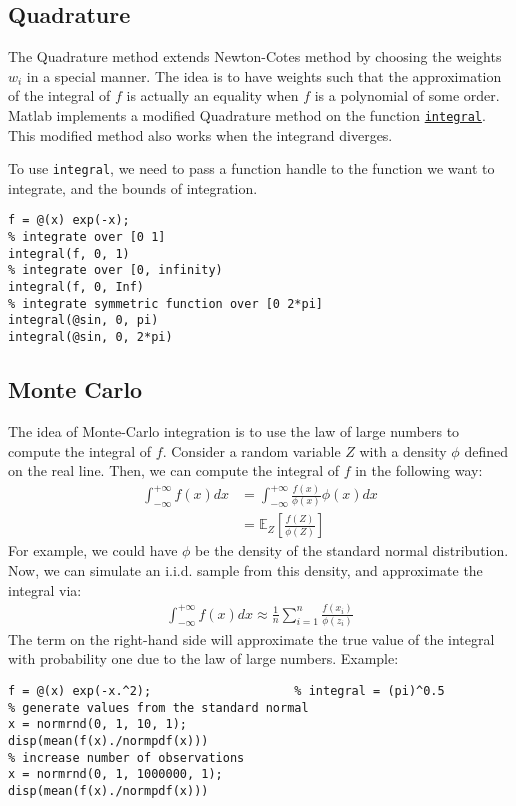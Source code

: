 \documentclass[12pt, a4paper]{article}
\begin{document}
\subsection{Quadrature}
\label{sec:org4ff9752}
The Quadrature method extends Newton-Cotes method by choosing the weights \(w_i\) in a special manner.
The idea is to have weights such that the approximation of the integral of \(f\) is actually an equality when \(f\) is a polynomial of some order.
Matlab implements a modified Quadrature method on the function \href{https://www.mathworks.com/help/matlab/ref/integral.html}{\texttt{integral}}.
This modified method also works when the integrand diverges.

To use \texttt{integral}, we need to pass a function handle to the function we want to integrate, and the bounds of integration.
\lstset{language=matlab,label= ,caption= ,captionpos=b,firstnumber=1,numbers=left,style=Matlab-editor}
\begin{lstlisting}
f = @(x) exp(-x);
% integrate over [0 1]
integral(f, 0, 1)
% integrate over [0, infinity)
integral(f, 0, Inf)
% integrate symmetric function over [0 2*pi]
integral(@sin, 0, pi)
integral(@sin, 0, 2*pi)
\end{lstlisting}
\subsection{Monte Carlo}
\label{sec:org228ac69}
The idea of Monte-Carlo integration is to use the law of large numbers to compute the integral of \(f\).
Consider a random variable \(Z\) with a density \(\phi\) defined on the real line.
Then, we can compute the integral of \(f\) in the following way:
\begin{align*}
\int_{-\infty}^{+\infty}f(x)dx &= \int_{-\infty}^{ +\infty}\frac{f(x)}{\phi(x)}\phi(x)dx\\
&= \mathbb{E}_{Z}\left[\frac{f(Z)}{\phi(Z)}\right]
\end{align*}
For example, we could have \(\phi\) be the density of the standard normal distribution.
Now, we can simulate an i.i.d. sample from this density, and approximate the integral via:
\begin{align*}
\int_{-\infty}^{+\infty}f(x)dx\approx\frac{1}{n}\sum_{i=1}^n\frac{f(x_i)}{\phi(z_i)}
\end{align*}
The term on the right-hand side will approximate the true value of the integral with probability one due to the law of large numbers.
Example:
\lstset{language=matlab,label= ,caption= ,captionpos=b,firstnumber=1,numbers=left,style=Matlab-editor}
\begin{lstlisting}
f = @(x) exp(-x.^2);                    % integral = (pi)^0.5
% generate values from the standard normal
x = normrnd(0, 1, 10, 1);
disp(mean(f(x)./normpdf(x)))
% increase number of observations
x = normrnd(0, 1, 1000000, 1);
disp(mean(f(x)./normpdf(x)))
\end{lstlisting}
\end{document}
